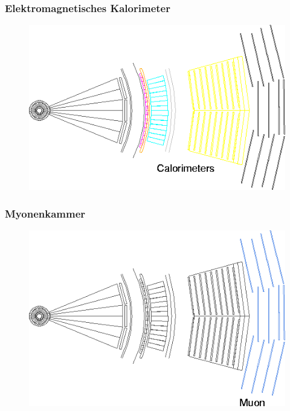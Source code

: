 \begin{frame}
	\frametitle{Elektromagnetisches Kalorimeter}
	\begin{center}
		\begin{figure}
			\includegraphics[width=0.75\linewidth]{graphics/slice_calorimeter_tr}
		\end{figure}
	\end{center}
\end{frame}

\begin{frame}
	\frametitle{Myonenkammer}
	\begin{center}
		\begin{figure}
			\includegraphics[width=0.75\linewidth]{graphics/slice_muon_tr}
		\end{figure}
	\end{center}
\end{frame}


